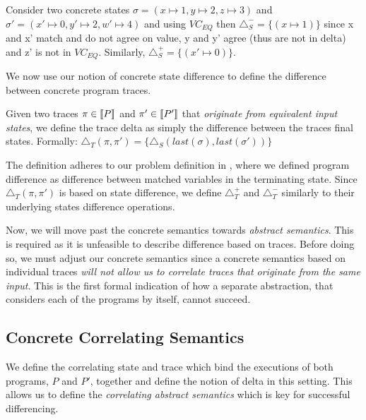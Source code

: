 \begin{Example}
Consider two concrete states $\sigma = (x \mapsto 1,y \mapsto 2,z \mapsto 3)$ and $\sigma' = (x' \mapsto 0,y' \mapsto 2,w' \mapsto 4)$ and using $VC_{EQ}$ then $\triangle_{S}^{-} = \{ (x \mapsto 1) \}$ since x and x' match and do not agree on value, y and y' agree (thus are not in delta) and z' is not in $VC_{EQ}$. Similarly, $\triangle_{S}^{+} = \{ (x' \mapsto 0) \}$.
\end{Example}

We now use our notion of concrete state difference to define the difference between concrete program traces.

\begin{definition}
Given two traces $\pi \in \lbrack\!\lbrack P \rbrack\!\rbrack$ and $\pi' \in \lbrack\!\lbrack P' \rbrack\!\rbrack$ that \emph{originate from equivalent input states}, we define the trace delta as simply the difference between the traces final states. Formally:
$
\triangle_{T}(\pi,\pi') = \{ \triangle_{S}(last(\sigma),last(\sigma')) \}
$
\end{definition}

The definition adheres to our problem definition in , where we defined program difference as difference between matched variables in the terminating state. Since $\triangle_{T}(\pi,\pi')$ is based on state difference, we define $\triangle_{T}^{+}$ and $\triangle_{T}^{-}$ similarly to their underlying states difference operations.

Now, we will move past the concrete semantics towards \emph{abstract semantics}. This is required as it is unfeasible to describe difference based on traces. Before doing so, we must adjust our concrete semantics since a concrete semantics based on individual traces \emph{will not allow us to correlate traces that originate from the same input}. This is the first formal indication of how a separate abstraction, that considers each of the programs by itself, cannot succeed.

\subsection{Concrete Correlating Semantics} 

We define the correlating state and trace which bind the executions of both programs, $P$ and $P'$, together and define the notion of delta in this setting. This allows us to define the \emph{correlating abstract semantics} which is key for successful differencing.


